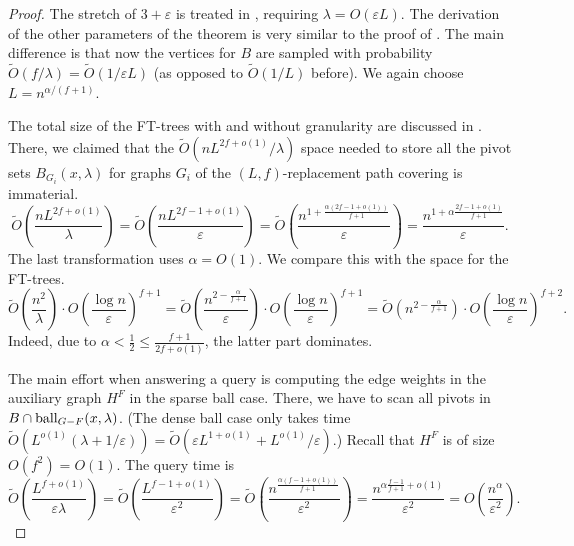 \documentclass{theoretics}
\newcommand*{\Otilde}{\widetilde{O}}
\newcommand*{\ball}{\mbox{\rm ball}}
\renewcommand{\le}{\leqslant}
\begin{document}
\begin{proof}
	The stretch of $3+\varepsilon$ is treated in ,
	requiring $\lambda = O(\varepsilon L)$.
	The derivation of the other parameters of the theorem is very similar to the proof of .
	The main difference is that now the vertices for $B$ are sampled with probability
	$\Otilde(f/\lambda) = \Otilde(1/\varepsilon L)$ (as opposed to $\Otilde(1/L)$ before).
	We again choose $L = n^{\alpha/(f+1)}$.
	
	The total size of the FT-trees with and without granularity
	are discussed in .
	There, we claimed that the $\Otilde(nL^{2f+o(1)}/\lambda)$ space needed
	to store all the pivot sets $B_{G_i}(x,\lambda)$ 
	for graphs $G_i$ of the $(L,f)$-replacement path covering is immaterial.
	\begin{equation*}
		\Otilde\!\left(\frac{nL^{2f+o(1)}}{\lambda}\right) 
			= \Otilde\!\left(\frac{nL^{2f-1+o(1)}}{\varepsilon}\right)
			= \Otilde\left(\frac{n^{1+ \frac{\alpha(2f-1+o(1))}{f+1}}}{\varepsilon}\right)
			= \frac{n^{1+\alpha\frac{2f-1+o(1)}{f+1}}}{\varepsilon}.
	\end{equation*}
	The last transformation uses $\alpha = O(1)$.
	We compare this with the space for the FT-trees.
	\begin{equation*}
		\Otilde\!\left(\frac{n^2}{\lambda}\right) \cdot O\!\left(\frac{\log n}{\varepsilon}\right)^{f+1}
			= \Otilde\!\left(\frac{n^{2-\frac{\alpha}{f+1}}}{\varepsilon}\right) \cdot O\!\left(\frac{\log n}{\varepsilon}\right)^{f+1}
			= \Otilde(n^{2-\frac{\alpha}{f+1}}) \cdot O\!\left(\frac{\log n}{\varepsilon}\right)^{f+2}.
	\end{equation*}
	Indeed, due to $\alpha < \frac{1}{2} \le \frac{f+1}{2f+o(1)}$,
	the latter part dominates.
	
	The main effort when answering a query is computing the edge weights in the auxiliary graph $H^F$
	in the sparse ball case.
	There, we have to scan all pivots in $B \cap \ball_{G-F}(x,\lambda)$.
	(The dense ball case only takes time 
	$\Otilde(L^{o(1)}(\lambda + 1/\varepsilon)) 
		= \Otilde(\varepsilon L^{1+o(1)} + L^{o(1)}/\varepsilon)$.)
	Recall that $H^F$ is of size $O(f^2) = O(1)$.
	The query time is
	\begin{equation*}
		\Otilde\!\left(\frac{L^{f+o(1)}}{\varepsilon \lambda}\right)
			= \Otilde\!\left(\frac{L^{f-1+o(1)}}{\varepsilon^2}\right)
			= \Otilde\!\left(\frac{n^{\frac{\alpha(f-1+o(1))}{f+1}}}{\varepsilon^2}\right)
			= \frac{n^{\alpha\frac{f-1}{f+1}+o(1)}}{\varepsilon^2} 
			= O\!\left(\frac{n^\alpha}{\varepsilon^2}\right).
	\end{equation*}


\end{proof}
\end{document}
